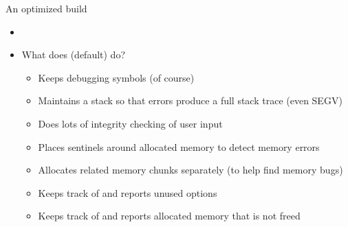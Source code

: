 \begin{frame}{An optimized build}
  \begin{itemize}
  \item {}
  \item What does  (default) do?
    \begin{itemize}
    \item Keeps debugging symbols (of course)
    \item Maintains a stack so that errors produce a full stack trace (even SEGV)
    \item Does lots of integrity checking of user input
    \item Places sentinels around allocated memory to detect memory errors
    \item Allocates related memory chunks separately (to help find memory bugs)
    \item Keeps track of and reports unused options
    \item Keeps track of and reports allocated memory that is not freed \\
      \quad {}
    \end{itemize}
  \end{itemize}
\end{frame}
